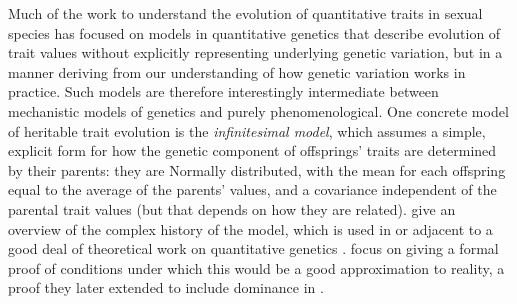 \documentclass{article}
\newcommand{\1}{\mathbbm{1}}
\theoremstyle{remark}
\theoremstyle{definition}
\begin{document}
Much of the work to 
understand the evolution of quantitative traits in sexual species
has focused on models in quantitative genetics
that describe evolution of trait values without explicitly representing underlying genetic variation,
but in a manner deriving from our understanding of how genetic variation works in practice.
Such models are therefore
interestingly intermediate between mechanistic models of genetics and purely phenomenological.
One concrete model of heritable trait evolution is the \emph{infinitesimal model},
which assumes a simple, explicit form for how the genetic component of offsprings' traits are determined by their parents:
they are Normally distributed, with the mean for each offspring equal to the average of the parents' values,
and a covariance independent of the parental trait values (but that depends on how they are related).
\citet{barton2017infinitesimal} give an overview of the complex history of the model, 
which is used in or adjacent to a good deal of theoretical work on quantitative genetics
\citep[e.g.,][]{fisher1918correlation,bulmer1971effect,lande1975maintenance}.
\citet{barton2017infinitesimal} focus on giving a formal proof of conditions
under which this would be a good approximation to reality,
a proof they later extended to include dominance in \citet{barton2022infinitesimal}.
\end{document}
